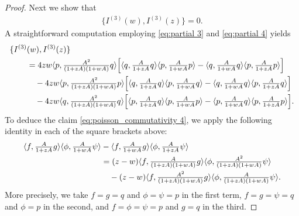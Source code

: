 \documentclass[10pt,a4paper]{amsart}
\newcommand{\la}{\langle}
\newcommand{\ra}{\rangle}
\begin{document}
\begin{proof}
Next we show that
\begin{align}\label{eq:poisson_commutativity 4}
\{I^{(3)}(w),I ^{(3)}(z) \}=0.
\end{align}
A straightforward computation employing \eqref{eq:partial 3} and \eqref{eq:partial 4} yields
\begin{align*}
\{I^{(3)}&(w),I ^{(3)}(z) \}\\
&=4zw \la p, \tfrac{A^2}{(1+zA)(1+wA)}q\ra\Bigl[  \la q, \tfrac{A}{1+zA}q\ra\la p, \tfrac{A}{1+wA}p\ra -  \la q, \tfrac{A}{1+wA}q\ra\la p, \tfrac{A}{1+zA}p\ra\Bigr]\\
&\quad-4zw\la p, \tfrac{A^2}{(1+zA)(1+wA)}p\ra\Bigl[  \la q, \tfrac{A}{1+zA}q\ra\la p, \tfrac{A}{1+wA}q\ra -  \la q, \tfrac{A}{1+wA}q\ra\la p, \tfrac{A}{1+zA}q\ra\Bigr]\\
&\quad-4zw\la q, \tfrac{A^2}{(1+zA)(1+wA)}q\ra\Bigl[  \la p, \tfrac{A}{1+zA}q\ra\la p, \tfrac{A}{1+wA}p\ra -  \la p, \tfrac{A}{1+wA}q\ra\la p, \tfrac{A}{1+zA}p\ra\Bigr].
\end{align*}
To deduce the claim \eqref{eq:poisson_commutativity 4}, we apply the following identity in each of the square brackets above:
\begin{align}\label{id 2}
 \la f, \tfrac{A}{1+zA}g\ra\la \phi, \tfrac{A}{1+wA}\psi\ra &-  \la f, \tfrac{A}{1+wA}g\ra\la \phi, \tfrac{A}{1+zA}\psi\ra\notag\\
 &=(z-w) \la f, \tfrac{A}{(1+zA)(1+wA)}g\ra \la \phi, \tfrac{A^2}{(1+zA)(1+wA)}\psi\ra\\
 &\quad - (z-w) \la f, \tfrac{A^2}{(1+zA)(1+wA)}g\ra \la \phi, \tfrac{A}{(1+zA)(1+wA)}\psi\ra .\notag
\end{align}
More precisely, we take $f=g=q$ and $\phi=\psi=p$ in the first term, $f=g=\psi=q$ and $\phi=p$ in the second, and $f=\phi=\psi=p$ and $g=q$ in the third.


\end{proof}
\end{document}
